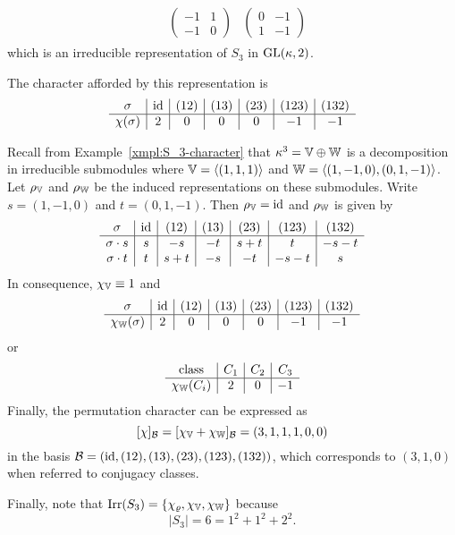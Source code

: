 \begin{xmpl}
\begin{align*}
\begin{array}{c|c|c|c|c|c|c}
                        &\begin{pmatrix}
                            -1&1\\
                            -1&0
                        \end{pmatrix}
                        &\begin{pmatrix}
                            0&-1\\
                            1&-1
                        \end{pmatrix}
                    \end{array}
                \end{align*}
                which is an irreducible representation of $S_3$ in $\operatorname{GL}(\kappa,2)$.
            
                The character afforded by this representation is
                $$
                \begin{array}{c|c|c|c|c|c|c}
                    \sigma&\operatorname{id}&(12)&(13)&(23)&(123)&(132)\\\hline
                    \chi(\sigma)&2&0&0&0&-1&-1
                \end{array}
                $$
                \fi
                
    Recall from Example~\ref{xmpl:S_3-character} that $\kappa^3=\mathbb V\oplus\mathbb W$ is a decomposition in irreducible submodules where $\mathbb V=\langle(1,1,1)\rangle$ and $\mathbb W=\langle(1,-1,0),(0,1,-1)\rangle$. Let $\rho_\mathbb V$ and $\rho_\mathbb W$ be the induced representations on these submodules. Write $s=(1,-1,0)$ and $t=(0,1,-1)$. Then $\rho_\mathbb V=\operatorname{id}$ and $\rho_\mathbb W$ is given by
    $$
        \begin{array}{c|c|c|c|c|c|c}
            \sigma&\operatorname{id}&(12)&(13)&(23)&(123)&(132)\\\hline
            \sigma\cdot s&s&-s&-t&s+t&t&-s-t\\
            \sigma\cdot t&t&s+t&-s&-t&-s-t&s
        \end{array}
    $$
    In consequence, $\chi_\mathbb V\equiv1$ and
    $$
    \begin{array}{c|c|c|c|c|c|c}
        \sigma&\operatorname{id}&(12)&(13)&(23)&(123)&(132)\\\hline
        \chi_\mathbb W(\sigma)&2&0&0&0&-1&-1
    \end{array}
    $$
    or
    $$
    \begin{array}{c|c|c|c}
        \text{class}&C_1&C_2&C_3\\\hline
        \chi_\mathbb W(C_i)&2&0&-1
    \end{array}
    $$
    Finally, the permutation character can be expressed as
    $$
        [\chi]_{\mathcal B} = [\chi_\mathbb V+\chi_\mathbb W]_{\mathcal B} = (3,1,1,1,0,0)
    $$
    in the basis $\mathcal B=(\operatorname{id},(12),(13),(23),(123),(132))$, which corresponds to $(3,1,0)$ when referred to conjugacy classes.

    Finally, note that $\operatorname{Irr}(S_3)=\{\chi_\varrho,\chi_\mathbb V,\chi_\mathbb W\}$ because
    $$
        |S_3| = 6 = 1^2 + 1^2 + 2^2.
    $$
\end{xmpl}

